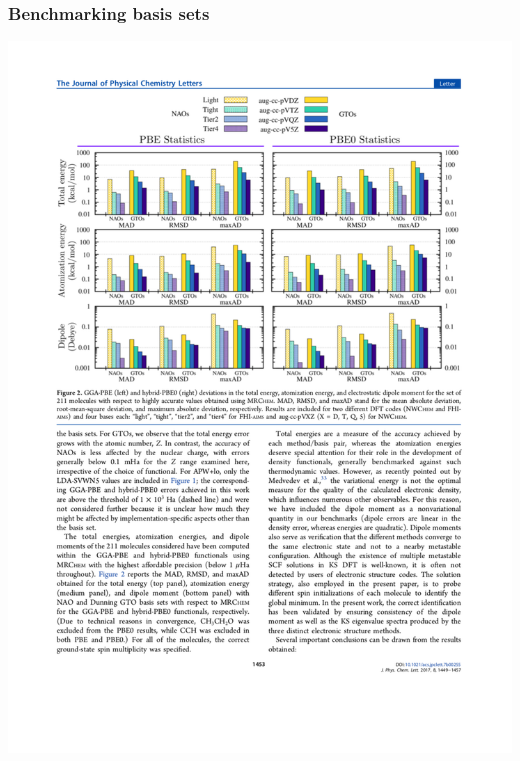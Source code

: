 \begin{frame}
    \frametitle{Benchmarking basis sets}
    \begin{center}
	\includegraphics[scale=0.70, clip, viewport = 180 730 430 782]{figures/elephant_molecules.pdf}
    \end{center}
    \begin{center}

\end{center}
\end{frame}
